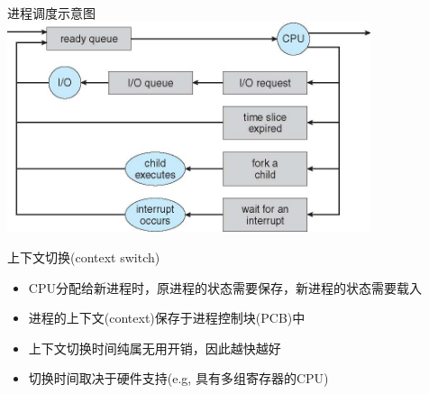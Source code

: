 \documentclass[xcolor=svgnames]{beamer}
\begin{document}
\begin{CJK*}{UTF8}{gbsn}
\begin{frame}{进程调度示意图}
\includegraphics[width=0.8\textwidth]{scheduling.jpg}
\end{frame}


\begin{frame}{上下文切换(context switch)}
\begin{itemize}
\item CPU分配给新进程时，原进程的状态需要保存，新进程的状态需要载入
\item 进程的上下文(context)保存于进程控制块(PCB)中
\item 上下文切换时间纯属无用开销，因此越快越好
\item 切换时间取决于硬件支持(e.g, 具有多组寄存器的CPU)
\end{itemize}
\end{frame}





\end{CJK*}
\end{document}
